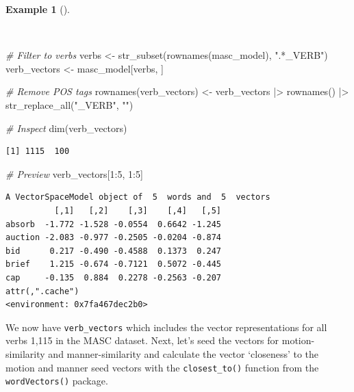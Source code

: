 \documentclass[
  letterpaper,
]{book}
\newenvironment{Shaded}{\begin{snugshade}}{\end{snugshade}}
\newcommand{\CommentTok}[1]{\textcolor[rgb]{0.00,0.00,0.00}{\textit{#1}}}
\newcommand{\DecValTok}[1]{\textcolor[rgb]{0.00,0.00,0.00}{#1}}
\newcommand{\FunctionTok}[1]{\textcolor[rgb]{0.00,0.00,0.00}{#1}}
\newcommand{\NormalTok}[1]{\textcolor[rgb]{0.00,0.00,0.00}{#1}}
\newcommand{\OtherTok}[1]{\textcolor[rgb]{0.00,0.00,0.00}{#1}}
\newcommand{\SpecialCharTok}[1]{\textcolor[rgb]{0.00,0.00,0.00}{#1}}
\newcommand{\StringTok}[1]{\textcolor[rgb]{0.00,0.00,0.00}{#1}}
\theoremstyle{definition}
\newtheorem{example}{Example}[chapter]
\theoremstyle{remark}
\begin{document}
\begin{example}[]\protect\hypertarget{exm-explore-masc-vsm-word2vec-verbs}{}\label{exm-explore-masc-vsm-word2vec-verbs}

~

\begin{Shaded}
\begin{Highlighting}[]
\CommentTok{\# Filter to verbs}
\NormalTok{verbs }\OtherTok{\textless{}{-}} \FunctionTok{str\_subset}\NormalTok{(}\FunctionTok{rownames}\NormalTok{(masc\_model), }\StringTok{".*\_VERB"}\NormalTok{)}
\NormalTok{verb\_vectors }\OtherTok{\textless{}{-}}\NormalTok{ masc\_model[verbs, ]}

\CommentTok{\# Remove POS tags}
\FunctionTok{rownames}\NormalTok{(verb\_vectors) }\OtherTok{\textless{}{-}}
\NormalTok{  verb\_vectors }\SpecialCharTok{|\textgreater{}}
  \FunctionTok{rownames}\NormalTok{() }\SpecialCharTok{|\textgreater{}}
  \FunctionTok{str\_replace\_all}\NormalTok{(}\StringTok{"\_VERB"}\NormalTok{, }\StringTok{""}\NormalTok{)}

\CommentTok{\# Inspect}
\FunctionTok{dim}\NormalTok{(verb\_vectors)}
\end{Highlighting}
\end{Shaded}

\begin{verbatim}
[1] 1115  100
\end{verbatim}

\begin{Shaded}
\begin{Highlighting}[]
\CommentTok{\# Preview}
\NormalTok{verb\_vectors[}\DecValTok{1}\SpecialCharTok{:}\DecValTok{5}\NormalTok{, }\DecValTok{1}\SpecialCharTok{:}\DecValTok{5}\NormalTok{]}
\end{Highlighting}
\end{Shaded}

\begin{verbatim}
A VectorSpaceModel object of  5  words and  5  vectors
          [,1]   [,2]    [,3]    [,4]   [,5]
absorb  -1.772 -1.528 -0.0554  0.6642 -1.245
auction -2.083 -0.977 -0.2505 -0.0204 -0.874
bid      0.217 -0.490 -0.4588  0.1373  0.247
brief    1.215 -0.674 -0.7121  0.5072 -0.445
cap     -0.135  0.884  0.2278 -0.2563 -0.207
attr(,".cache")
<environment: 0x7fa467dec2b0>
\end{verbatim}

\end{example}

We now have \texttt{verb\_vectors} which includes the vector
representations for all verbs 1,115 in the MASC dataset. Next, let's
seed the vectors for motion-similarity and manner-similarity and
calculate the vector `closeness' to the motion and manner seed vectors
with the \texttt{closest\_to()} function from the \texttt{wordVectors()}
package.
\end{document}
